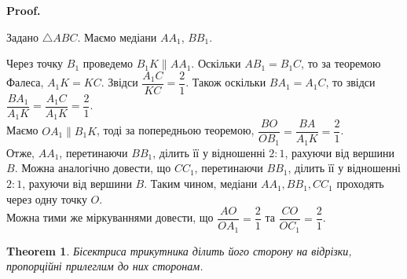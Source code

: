 \documentclass[a4paper, 10pt]{article}
\makeatletter
\def\qed{$\blacksquare$}
\theoremstyle{theoremdd}
\newtheorem{theorem}{Theorem}[subsection]
\theoremstyle{theoremdd}
\theoremstyle{theoremdd}
\theoremstyle{theoremdd}
\theoremstyle{theoremdd}
\theoremstyle{theoremdd}
\theoremstyle{theoremdd}
\theoremstyle{theoremdd}
\theoremstyle{theoremdd}
\renewenvironment{proof}[1][Proof.\\]{\par
\pushQED{\hfill \qed}%
\normalfont \topsep6\p@\@plus6\p@\relax
\trivlist
\item\relax
{\bfseries
#1\@addpunct{.}}\hspace\labelsep\ignorespaces
}{%
\popQED\endtrivlist\@endpefalse
}
\makeatother
\begin{document}
\begin{proof}
Задано $\triangle ABC$. Маємо медіани $AA_1$, $BB_1$.
\begin{figure}[H]
\centering
{}
\end{figure}
Через точку $B_1$ проведемо $B_1K \parallel AA_1$. Оскільки $AB_1 = B_1C$, то за теоремою Фалеса, $A_1K = KC$. Звідси $\dfrac{A_1C}{KC} = \dfrac{2}{1}$. Також оскільки $BA_1 = A_1C$, то звідси $\dfrac{BA_1}{A_1K} = \dfrac{A_1C}{A_1K} = \dfrac{2}{1}$.\\
Маємо $OA_1 \parallel B_1K$, тоді за попередньою теоремою, $\dfrac{BO}{OB_1} = \dfrac{BA}{A_1K} = \dfrac{2}{1}$.\\
Отже, $AA_1$, перетинаючи $BB_1$, ділить її у відношенні $2 : 1$, рахуючи від вершини $B$. Можна аналогічно довести, що $CC_1$, перетинаючи $BB_1$, ділить її у відношенні $2 : 1$, рахуючи від вершини $B$. Таким чином, медіани $AA_1,BB_1,CC_1$ проходять через одну точку $O$.
\bigskip \\
Можна тими же міркуваннями довести, що $\dfrac{AO}{OA_1} = \dfrac{2}{1}$ та $\dfrac{CO}{OC_1} = \dfrac{2}{1}$.
\end{proof}

\begin{theorem}
Бісектриса трикутника ділить його сторону на відрізки, пропорційні прилеглим до них сторонам.
\end{theorem}
\end{document}
